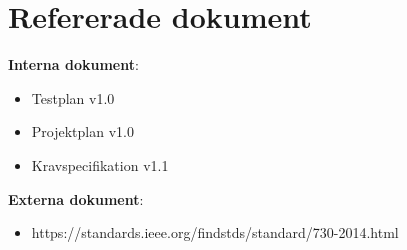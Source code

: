 \section{Refererade dokument}
\textbf{Interna dokument}: 
\begin{itemize}
\item Testplan v1.0
\item Projektplan v1.0
\item Kravspecifikation v1.1
\end{itemize}
\textbf{Externa dokument}:
\begin{itemize}
\item https://standards.ieee.org/findstds/standard/730-2014.html
\end{itemize}